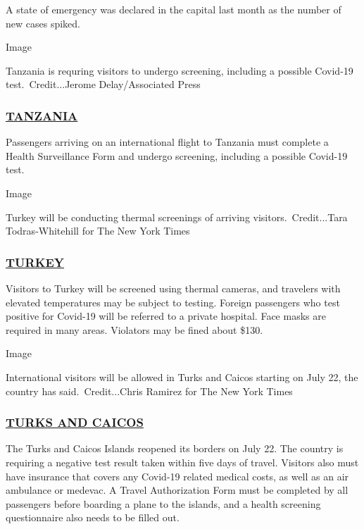A state of emergency was declared in the capital last month as the
number of new cases spiked.

Image

Tanzania is requring visitors to undergo screening, including a possible
Covid-19 test.~Credit...Jerome Delay/Associated Press

\hypertarget{tanzania}{%
\subsubsection{\texorpdfstring{\href{https://tanzaniaembassy-us.org}{TANZANIA}}{TANZANIA}}\label{tanzania}}

Passengers arriving on an international flight to Tanzania must complete
a Health Surveillance Form and undergo screening, including a possible
Covid-19 test.

Image

Turkey will be conducting thermal screenings of arriving
visitors.~Credit...Tara Todras-Whitehill for The New York Times

\hypertarget{turkey}{%
\subsubsection{\texorpdfstring{\href{https://tr.usembassy.gov/covid-19-information-2/}{TURKEY}}{TURKEY}}\label{turkey}}

Visitors to Turkey will be screened using thermal cameras, and travelers
with elevated temperatures may be subject to testing. Foreign passengers
who test positive for Covid-19 will be referred to a private hospital.
Face masks are required in many areas. Violators may be fined about
\$130.

Image

International visitors will be allowed in Turks and Caicos starting on
July 22, the country has said.~Credit...Chris Ramirez for The New York
Times

\hypertarget{turks-and-caicos}{%
\subsubsection{\texorpdfstring{\href{https://turksandcaicostourism.com/}{TURKS
AND CAICOS}}{TURKS AND CAICOS}}\label{turks-and-caicos}}

The Turks and Caicos Islands reopened its borders on July 22. The
country is requiring a negative test result taken within five days of
travel. Visitors also must have insurance that covers any Covid-19
related medical costs, as well as an air ambulance or medevac. A Travel
Authorization Form must be completed by all passengers before boarding a
plane to the islands, and a health screening questionnaire also needs to
be filled out.

